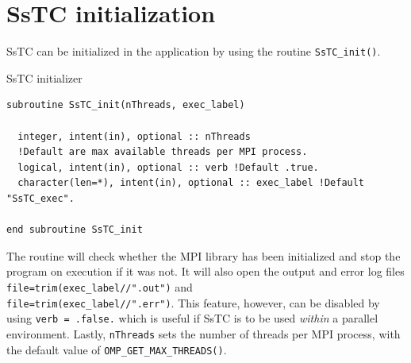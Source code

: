 \documentclass[10pt,a4paper]{article}
\begin{document}
\section{SsTC initialization}
SsTC can be initialized in the application by using the routine \verb|SsTC_init()|.
\begin{codebox}{SsTC initializer}
\begin{lstlisting}[caption={Interface of ``SsTC initialization".},captionpos=b]
subroutine SsTC_init(nThreads, exec_label)

  integer, intent(in), optional :: nThreads
  !Default are max available threads per MPI process.
  logical, intent(in), optional :: verb !Default .true.
  character(len=*), intent(in), optional :: exec_label !Default "SsTC_exec".

end subroutine SsTC_init
\end{lstlisting}
\end{codebox}
The routine will check whether the MPI library has been initialized and stop the program on execution if it was not. It will also open the output and error log files \verb|file=trim(exec_label//".out")| and \\ \verb|file=trim(exec_label//".err")|. This feature, however, can be disabled by using \verb|verb = .false.| which is useful if SsTC is to be used \textit{within} a parallel environment. Lastly, \verb|nThreads| sets the number of threads per MPI process, with the default value of \verb|OMP_GET_MAX_THREADS()|.
\end{document}
